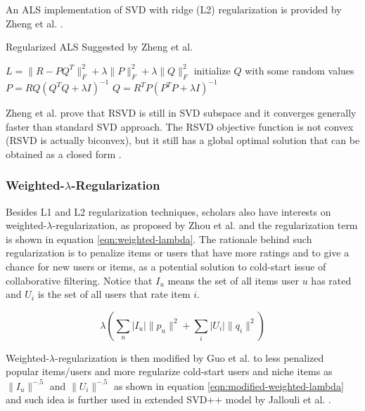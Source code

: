 \documentclass[letter paper, 11pt]{article}
\begin{document}
	An ALS implementation of SVD with ridge (L2) regularization is provided by Zheng et al. \cite{RSVD}.
	
	\renewcommand{\algorithmicrequire}{\textbf{Input:}}
	
	\begin{algorithm}
		\caption{Regularized ALS Suggested by Zheng et al.\cite{RSVD}}
		\label{L1}
		\begin{algorithmic}
			\STATE $L = \| R - P Q^T \|_F^2 + \lambda \| P \|_F^2 + \lambda \| Q \|_F^2$
			\STATE initialize $Q$ with some random values
			\REPEAT
				\STATE $ P = R Q(Q^TQ + \lambda I)^{-1} $
				\STATE $ Q = R^T P(P^T P + \lambda I)^{-1} $
		\end{algorithmic}
	\end{algorithm}

	Zheng et al. \cite{RSVD} prove that RSVD is still in SVD subspace and it converges generally faster than standard SVD approach. The RSVD objective function is not convex (RSVD is actually biconvex), but it still has a global optimal solution that can be obtained as a closed form \cite{RSVD}.
	
	\subsubsection{Weighted-$\lambda$-Regularization}
	Besides L1 and L2 regularization techniques, scholars also have interests on weighted-$\lambda$-regularization, as proposed by Zhou et al. \cite{weighted-lambda-old} and the regularization term is shown in equation \ref{eqn:weighted-lambda}. The rationale behind such regularization is to penalize items or users that have more ratings and to give a chance for new users or items, as a potential solution to cold-start issue of collaborative filtering. Notice that $I_u$ means the set of all items user $u$ has rated and $U_i$ is the set of all users that rate item $i$.
	
	\begin{equation}
		\label{eqn:weighted-lambda}
		\lambda (\sum_u |I_u| \|p_u\|^2 + \sum_i |U_i| \|q_i\|^2)
	\end{equation}
	
	Weighted-$\lambda$-regularization is then modified by Guo et al. \cite{R-Model} to less penalized popular items/users and more regularize cold-start users and niche items as $\|I_u\|^{-.5}$ and $\|U_i\|^{-.5}$ as shown in equation \ref{eqn:modified-weighted-lambda} and such idea is further used in extended SVD++ model by Jallouli et al. \cite{contextual}.
	
\end{document}
